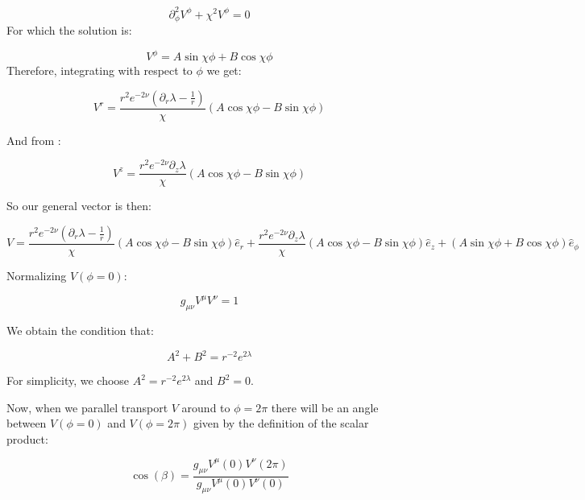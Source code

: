\documentclass{article}
\begin{document}
\begin{equation}
\partial^2_\phi V^\phi+\chi^2 V^\phi=0
\end{equation}
For which the solution is:

\begin{equation}
V^{\phi}=A\sin\chi\phi+B\cos\chi\phi
\end{equation}
Therefore, integrating  with respect to $\phi$ we get:

\begin{equation}
V^{r}=\frac{r^2e^{-2\nu}(\partial_r\lambda-\frac{1}{r})}{\chi}\left(A\cos\chi\phi-B\sin\chi\phi\right)
\end{equation}

And from :

\begin{equation}
V^{z}=\frac{r^2 e^{-2\nu}\partial_z\lambda}{\chi}\left(A\cos\chi\phi-B\sin\chi\phi\right)
\end{equation}

So our general vector is then:

\begin{equation}
\label{eq:V-from-par-transport}
V=\frac{r^2e^{-2\nu}(\partial_r\lambda-\frac{1}{r})}{\chi}\left(A\cos\chi\phi-B\sin\chi\phi\right)\hat{e}_{r}+\frac{r^2 e^{-2\nu}\partial_z\lambda}{\chi}\left(A\cos\chi\phi-B\sin\chi\phi\right)\hat{e}_{z}+\left(A\sin\chi\phi+B\cos\chi\phi\right)\hat{e}_{\phi}
\end{equation}

Normalizing $V(\phi=0)$:

\begin{equation}
\label{eq:inner-product}
g_{\mu\nu}V^{\mu}V^{\nu}=1
\end{equation}

We obtain the condition that:

\begin{equation}
A^2+B^2=r^{-2}e^{2\lambda}
\end{equation}

For simplicity, we choose $A^2=r^{-2}e^{2\lambda}$ and $B^2=0$. 

Now, when we parallel transport $V$ around to $\phi=2\pi$ there will be an angle between $V(\phi=0)$ and $V(\phi=2\pi)$ given by the definition of the scalar product:

\begin{equation}
\cos(\beta)=\frac{g_{\mu\nu}V^{\mu}(0)V^{\nu}(2\pi)}{g_{\mu\nu}V^{\mu}(0)V^{\nu}(0)}
\end{equation}
\end{document}
